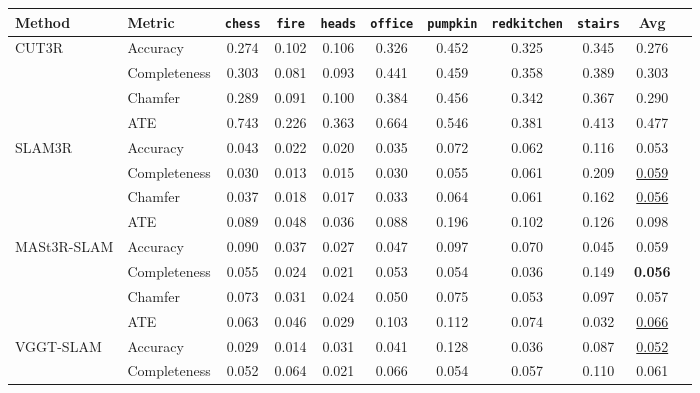 \clearpage
\setcounter{page}{1}
\maketitlesupplementary

\begin{strip}
  \vspace{-0em}
  \centering
  \captionsetup{type=table} %

\renewcommand{\arraystretch}{1.1}
\setlength{\tabcolsep}{4.5pt}
\centering
\renewcommand{\arraystretch}{1.1}
\setlength{\tabcolsep}{4pt}
\begin{tabular}{llccccccccc}
\toprule
Method & Metric & \texttt{chess} & \texttt{fire} & \texttt{heads} & \texttt{office} & \texttt{pumpkin} & \texttt{redkitchen} & \texttt{stairs} & Avg \\
\midrule
\multirow{4}{*}{CUT3R}
& Accuracy     & 0.274 & 0.102 & 0.106 & 0.326 & 0.452 & 0.325 & 0.345 & 0.276 \\
& Completeness & 0.303 & 0.081 & 0.093 & 0.441 & 0.459 & 0.358 & 0.389 & 0.303 \\
& Chamfer      & 0.289 & 0.091 & 0.100 & 0.384 & 0.456 & 0.342 & 0.367 & 0.290 \\
& ATE   & 0.743 & 0.226 & 0.363 & 0.664 & 0.546 & 0.381 & 0.413 & 0.477 \\
\midrule
\multirow{4}{*}{SLAM3R}
& Accuracy     & 0.043 & 0.022 & 0.020 & 0.035 & 0.072 & 0.062 & 0.116 & 0.053 \\
& Completeness & 0.030 & 0.013 & 0.015 & 0.030 & 0.055 & 0.061 & 0.209 & \underline{0.059} \\
& Chamfer      & 0.037 & 0.018 & 0.017 & 0.033 & 0.064 & 0.061 & 0.162 & \underline{0.056} \\
& ATE   & 0.089 & 0.048 & 0.036 & 0.088 & 0.196 & 0.102 & 0.126 & 0.098 \\
\midrule
\multirow{4}{*}{MASt3R-SLAM}
& Accuracy     & 0.090 & 0.037 & 0.027 & 0.047 & 0.097 & 0.070 & 0.045 & 0.059 \\
& Completeness & 0.055 & 0.024 & 0.021 & 0.053 & 0.054 & 0.036 & 0.149 & \bf{0.056} \\
& Chamfer      & 0.073 & 0.031 & 0.024 & 0.050 & 0.075 & 0.053 & 0.097 & 0.057 \\
& ATE   & 0.063 & 0.046 & 0.029 & 0.103 & 0.112 & 0.074 & 0.032 & \underline{0.066} \\
\midrule
\multirow{4}{*}{VGGT-SLAM}
& Accuracy     & 0.029 & 0.014 & 0.031 & 0.041 & 0.128 & 0.036 & 0.087 & \underline{0.052} \\
& Completeness & 0.052 & 0.064 & 0.021 & 0.066 & 0.054 & 0.057 & 0.110 & 0.061 \\

\end{tabular}
\end{strip}
